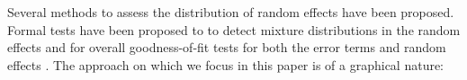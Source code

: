\documentclass[12pt]{article} %
\newcommand{\hh}[1]{{\color{orange} #1}}
\begin{document}



%
Several methods to assess the distribution of random effects  have been proposed. Formal tests have been proposed to to detect mixture distributions \citep{Verbeke:1996va} in the random effects and for overall goodness-of-fit tests for both the error terms and random effects \citep{Jiang:2001dx}.
\hh{The approach on which we focus in this paper is of a graphical nature:}
\end{document}
